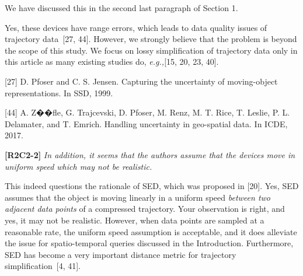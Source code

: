\documentclass{letter}
\newcommand{\eg}{\emph{e.g.,}\xspace}
\begin{document}
We have discussed this in the second last paragraph of Section 1.

Yes, these devices have range errors, which leads to data quality issues of trajectory data~[27, 44]. However, we strongly believe that the problem is beyond the scope of this study. We focus on lossy simplification of trajectory data only in this article as many existing studies do, \eg [15, 20, 23, 40].

[27] D. Pfoser and C. S. Jensen. Capturing the uncertainty of moving-object representations. In SSD, 1999.

[44] A. Z��fle, G. Trajcevski, D. Pfoser, M. Renz, M. T. Rice, T. Leslie, P. L. Delamater, and T. Emrich.
Handling uncertainty in geo-spatial data. In ICDE, 2017.

%




\textbf{[R2C2-2]} \emph{In addition, it seems that the authors assume that the devices move in uniform speed which may not be realistic.}

This indeed questions the rationale of SED, which was proposed in [20]. Yes, SED assumes that the object is moving linearly in a uniform speed \textit{between two adjacent data points} of a compressed trajectory. Your observation is right, and yes, it may not be realistic. However, when data points are sampled at a reasonable rate, the uniform speed assumption is acceptable, and it does alleviate the issue for spatio-temporal queries discussed in the Introduction. Furthermore, SED has become a very important distance metric for trajectory simplification~[4, 41].
\end{document}
